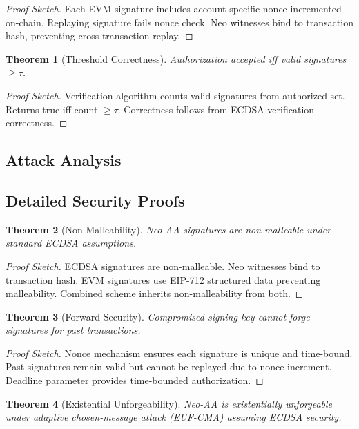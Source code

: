 \documentclass[10pt,twocolumn]{article}
\newtheorem{theorem}{Theorem}
\begin{document}
{\begin{proof}[Proof Sketch]
Each EVM signature includes account-specific nonce incremented on-chain. Replaying signature fails nonce check. Neo witnesses bind to transaction hash, preventing cross-transaction replay.
\end{proof}

\begin{theorem}[Threshold Correctness]
Authorization accepted iff valid signatures $\geq \tau$.
\end{theorem}

\begin{proof}[Proof Sketch]
Verification algorithm counts valid signatures from authorized set. Returns true iff count $\geq \tau$. Correctness follows from ECDSA verification correctness.
\end{proof}

\subsection{Attack Analysis}

\subsection{Detailed Security Proofs}

\begin{theorem}[Non-Malleability]
Neo-AA signatures are non-malleable under standard ECDSA assumptions.
\end{theorem}

\begin{proof}[Proof Sketch]
ECDSA signatures are non-malleable. Neo witnesses bind to transaction hash. EVM signatures use EIP-712 structured data preventing malleability. Combined scheme inherits non-malleability from both.
\end{proof}

\begin{theorem}[Forward Security]
Compromised signing key cannot forge signatures for past transactions.
\end{theorem}

\begin{proof}[Proof Sketch]
Nonce mechanism ensures each signature is unique and time-bound. Past signatures remain valid but cannot be replayed due to nonce increment. Deadline parameter provides time-bounded authorization.
\end{proof}


\begin{theorem}[Existential Unforgeability]
Neo-AA is existentially unforgeable under adaptive chosen-message attack (EUF-CMA) assuming ECDSA security.
\end{theorem}

}
\end{document}
